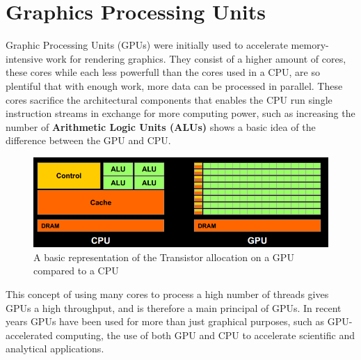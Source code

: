 \section{Graphics Processing Units}
Graphic Processing Units (GPUs) were initially used to accelerate memory-intensive work for rendering graphics.
They consist of a higher amount of cores, these cores while each less powerfull than the cores used in a CPU, are so plentiful that with enough work, more data can be processed in parallel.
These cores sacrifice the architectural components that enables the CPU run single instruction streams in exchange for more computing power, such as increasing the number of \textbf{Arithmetic Logic Units (ALUs)}  shows a basic idea of the difference between the GPU and CPU. %
\begin{figure}[h!]
\centering
 \includegraphics[width=1\textwidth]{figures/GPUCPUimage.png} %
\caption{A basic representation of the Transistor allocation on a GPU compared to a CPU}\label{image:GPUCPUimage} %
\vspace{-25pt}
\end{figure}

This concept of using many cores to process a high number of threads gives GPUs a high throughput, and is therefore a main principal of GPUs.
In recent years GPUs have been used for more than just graphical purposes, such as GPU-accelerated computing, the use of both GPU and CPU to accelerate scientific and analytical applications.



